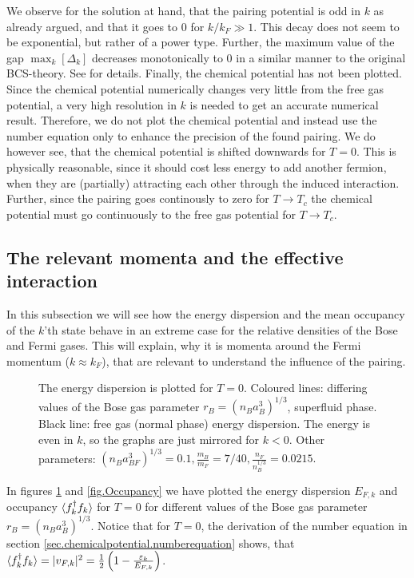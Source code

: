 We observe for the solution at hand, that the pairing potential is odd in $k$ as already argued, and that it goes to 0 for $k/k_F \gg 1$. This decay does not seem to be exponential, but rather of a power type. Further, the maximum value of the gap $\max_k[\Delta_k]$ decreases monotonically to 0 in a similar manner to the original BCS-theory. See \cite{Tinkham,BruusFlensberg,PlischkeStatPhys} for details. Finally, the chemical potential has not been plotted. Since the chemical potential numerically changes very little from the free gas potential, a very high resolution in $k$ is needed to get an accurate numerical result. Therefore, we do not plot the chemical potential and instead use the number equation only to enhance the precision of the found pairing. We do however see, that the chemical potential is shifted downwards for $T = 0$. This is physically reasonable, since it should cost less energy to add another fermion, when they are (partially) attracting each other through the induced interaction. Further, since the pairing goes continously to zero for $T\to T_c$ the chemical potential must go continuously to the free gas potential for $T\to T_c$. 


\subsection{The relevant momenta and the effective interaction}
In this subsection we will see how the energy dispersion and the mean occupancy of the $k$'th state behave in an extreme case for the relative densities of the Bose and Fermi gases. This will explain, why it is momenta around the Fermi momentum ($k \approx k_F$), that are relevant to understand the influence of the pairing. 

\begin{figure} 
\begin{center}  
  
\caption{The energy dispersion is plotted for $T = 0$. Coloured lines: differing values of the Bose gas parameter $r_B = (n_Ba_B^3)^{1/3}$, superfluid phase. Black line: free gas (normal phase) energy dispersion. The energy is even in $k$, so the graphs are just mirrored for $k < 0$. Other parameters: $(n_Ba_{BF}^3)^{1/3} = 0.1, \frac{m_B}{m_F} = 7/40, \frac{n_F}{n_B^{1/3}} = 0.0215.$ }  
\label{fig.EnergyDispersion}  
\end{center}    
\end{figure}

In figures \ref{fig.EnergyDispersion} and \ref{fig.Occupancy} we have plotted the energy dispersion $E_{F,k}$ and occupancy $\braket{f_k^\dagger f_k}$ for $T = 0$ for different values of the Bose gas parameter $r_B = (n_Ba_B^3)^{1/3}$. Notice that for $T = 0$, the derivation of the number equation in section \ref{sec.chemicalpotential.numberequation} shows, that $\braket{f_k^\dagger f_k} = |v_{F,k}|^2 = \frac{1}{2}\left(1 -  \frac{\varepsilon_k}{E_{F,k}}\right)$. 

